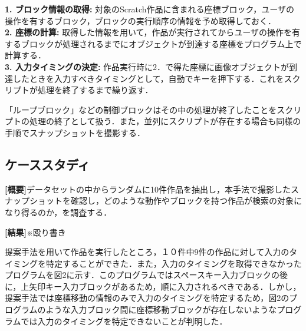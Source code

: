 \documentclass[uplatex,dvipdfmx,a4paper,twocolumn,base=11pt,jbase=11pt,ja=standard]{bxjsarticle}  %
\begin{document}
\noindent\textbf{1. ブロック情報の取得: }対象のScratch作品に含まれる座標ブロック，ユーザの操作を有するブロック，ブロックの実行順序の情報を予め取得しておく．\\
\noindent\textbf{2. 座標の計算: }取得した情報を用いて，作品が実行されてからユーザの操作を有するブロックが処理されるまでにオブジェクトが到達する座標をプログラム上で計算する．\\
\noindent\textbf{3. 入力タイミングの決定: }作品実行時に2．で得た座標に画像オブジェクトが到達したときを入力すべきタイミングとして，自動でキーを押下する．これをスクリプトが処理を終了するまで繰り返す．

「ループブロック」などの制御ブロックはその中の処理が終了したことをスクリプトの処理の終了として扱う．また，並列にスクリプトが存在する場合も同様の手順でスナップショットを撮影する．

\subsection{ケーススタディ}

\noindent\textbf{[概要]}データセットの中からランダムに10件作品を抽出し，本手法で撮影したスナップショットを確認し，どのような動作やブロックを持つ作品が検索の対象になり得るのか，を調査する．

\noindent\textbf{[結果]}※殴り書き

提案手法を用いて作品を実行したところ，１０件中9件の作品に対して入力のタイミングを特定することができた．また，入力のタイミングを取得できなかったプログラムを図2に示す．このプログラムではスペースキー入力ブロックの後に，上矢印キー入力ブロックがあるため，順に入力されるべきである．しかし，提案手法では座標移動の情報のみで入力のタイミングを特定するため，図2のプログラムのような入力ブロック間に座標移動ブロックが存在しないようなプログラムでは入力のタイミングを特定できないことが判明した．
\end{document}
